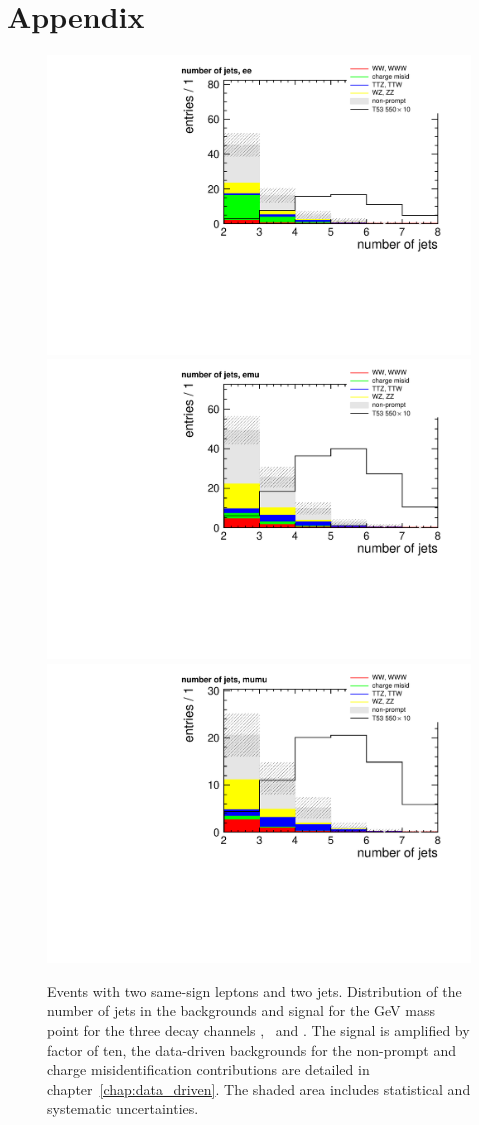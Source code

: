 \appendix
\chapter{Appendix}


\begin{figure}[htb]
    \centering
    \includegraphics[width=.7\textwidth]{images/pdf/same-sign,_2_jets/n_jets_ee_0}\\
    \includegraphics[width=.7\textwidth]{images/pdf/same-sign,_2_jets/n_jets_emu_0}\\
    \includegraphics[width=.7\textwidth]{images/pdf/same-sign,_2_jets/n_jets_mumu_0}
    \caption{Events with two same-sign leptons and two jets. Distribution of the number of jets in the backgrounds and
        signal for the \unit[550]{GeV} mass point for the three
        decay channels \E\E, \E\M\ and \M\M. The signal is
    amplified by factor of ten, the data-driven backgrounds for the
non-prompt and charge misidentification contributions are detailed in
chapter~\ref{chap:data_driven}. The shaded area includes statistical and
systematic uncertainties.}
    \label{fig:n_jets_app}
\end{figure}


